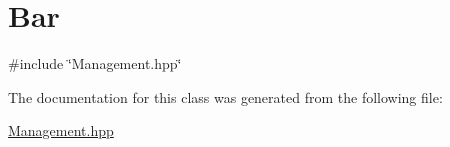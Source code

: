 \hypertarget{classBar}{}\section{Bar}
\label{classBar}


{\ttfamily \#include \char`\"{}Management.\+hpp\char`\"{}}



The documentation for this class was generated from the following file\+:\begin{DoxyCompactItemize}
\item 
\hyperlink{Management_8hpp}{Management.\+hpp}\end{DoxyCompactItemize}

